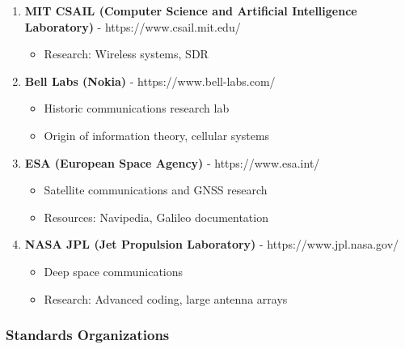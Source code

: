 \begin{enumerate}
\def\labelenumi{\arabic{enumi}.}
\setcounter{enumi}{59}
\tightlist
\item
  \textbf{MIT CSAIL (Computer Science and Artificial Intelligence
  Laboratory)} - https://www.csail.mit.edu/

  \begin{itemize}
  \tightlist
  \item
    Research: Wireless systems, SDR
  \end{itemize}
\item
  \textbf{Bell Labs (Nokia)} - https://www.bell-labs.com/

  \begin{itemize}
  \tightlist
  \item
    Historic communications research lab
  \item
    Origin of information theory, cellular systems
  \end{itemize}
\item
  \textbf{ESA (European Space Agency)} - https://www.esa.int/

  \begin{itemize}
  \tightlist
  \item
    Satellite communications and GNSS research
  \item
    Resources: Navipedia, Galileo documentation
  \end{itemize}
\item
  \textbf{NASA JPL (Jet Propulsion Laboratory)} -
  https://www.jpl.nasa.gov/

  \begin{itemize}
  \tightlist
  \item
    Deep space communications
  \item
    Research: Advanced coding, large antenna arrays
  \end{itemize}
\end{enumerate}

\subsubsection{Standards Organizations}\label{standards-organizations}

